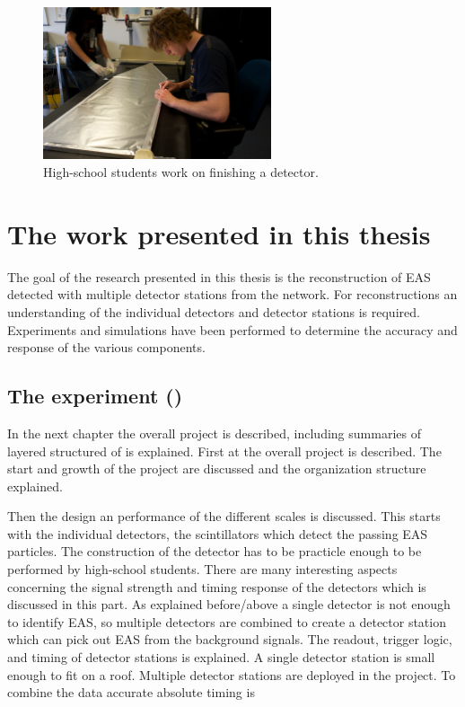 \begin{figure}
    \centering
    \includegraphics[width=0.6\textwidth]
                    {plots/cosmic-rays/ADL_100352}
    \caption{High-school students work on finishing a detector.}
    \label{fig:detector-bouw}
\end{figure}


\section{The work presented in this thesis}

The goal of the research presented in this thesis is the reconstruction of EAS detected with multiple detector stations from the \hisparc network. For reconstructions an understanding of the individual detectors and detector stations is required. Experiments and simulations have been performed to determine the accuracy and response of the various components.


\subsection{The \hisparc experiment
            ()}

In the next chapter the overall project is described, including summaries of layered structured of \hisparc is explained. First at the overall project is described. The start and growth of the project are discussed and the organization structure explained.

Then the design an performance of the different scales is discussed. This starts with the individual detectors, the scintillators which detect the passing EAS particles. The construction of the detector has to be practicle enough to be performed by high-school students. There are many interesting aspects concerning the signal strength and timing response of the detectors which is discussed in this part. As explained before/above a single detector is not enough to identify EAS, so multiple detectors are combined to create a detector station which can pick out EAS from the background signals. The readout, trigger logic, and timing of detector stations is explained. A single detector station is small enough to fit on a roof. Multiple detector stations are deployed in the \hisparc project. To combine the data accurate absolute timing is 


